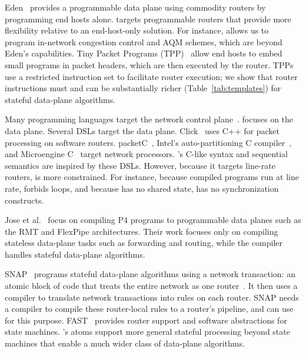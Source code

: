 Eden~\cite{eden} provides a programmable data plane using commodity routers by
programming end hosts alone. \pktlanguage targets programmable routers that
provide more flexibility relative to an end-host-only solution. For instance,
\pktlanguage allows us to program in-network congestion control and AQM
schemes, which are beyond Eden's capabilities.  Tiny Packet Programs
(TPP)~\cite{tpp} allow end hosts to embed small programs in packet headers,
which are then executed by the router. TPPs use a restricted instruction set to
facilitate router execution; we show that router instructions must and can be
substantially richer (Table~\ref{tab:templates}) for stateful data-plane
algorithms.

 Many programming languages target
the network control plane~\cite{frenetic, maple}. \pktlanguage focuses on the
data plane. Several DSLs target the data plane. Click~\cite{click} uses C++ for
packet processing on software routers. packetC~\cite{packetc}, Intel's
auto-partitioning C compiler~\cite{intel_uiuc_pldi}, and Microengine
C~\cite{microenginec} target network processors. \pktlanguage's C-like syntax
and sequential semantics are inspired by these DSLs. However, because it
targets line-rate routers, \pktlanguage is more constrained. For instance,
because compiled programs run at line rate, \pktlanguage forbids loops, and
because \absmachine has no shared state, \pktlanguage has no synchronization
constructs.

Jose et al.~\cite{lavanya_compiler} focus on compiling P4 programs to
programmable data planes such as the RMT and FlexPipe architectures. Their work
focuses only on compiling stateless data-plane tasks such as forwarding and
routing, while the \pktlanguage compiler handles stateful data-plane
algorithms.

SNAP~\cite{snap} programs stateful data-plane algorithms using a network
transaction: an atomic block of code that treats the entire network as one
router~\cite{onebigrouter}. It then uses a compiler to translate network
transactions into rules on each router. SNAP needs a compiler to compile these
router-local rules to a router's pipeline, and can use \pktlanguage for this
purpose. FAST~\cite{fast} provides router support and software abstractions for
state machines. \absmachine's atoms support more general stateful processing
beyond state machines that enable a much wider class of data-plane algorithms.

